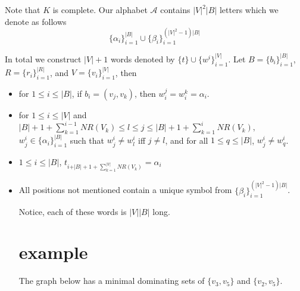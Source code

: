 \documentclass[10pt,a4paper]{article}
\begin{document}
Note that $K$ is complete. Our alphabet $\mathcal{A}$ contains 
$\vert V\vert^2\vert B\vert$ letters which we denote as follows
$$\{\alpha_{i}\}^{\vert B\vert}_{i=1}\cup \{\beta_{i}\}^{(\vert V\vert^2-1)\vert B\vert}_{i=1}$$

In total we construct $\vert V\vert+1$ words denoted by $\{ t\}\cup \{w^{i}\}^{\vert V\vert}_{i=1}$. Let $ B  = \{b_{i}\}^{\vert B\vert}
_{i=1}$, $ R  = \{r_{i}\}^{\vert R\vert}
_{i=1}$, and  $ V  = \{v_{i}\}^{\vert V\vert}_{i=1}$, then 
\begin{itemize}

\item for $1\leq i \leq \vert B\vert$, if $b_i = (v_j,v_k)$, then $w^j_i=w^k_i=\alpha_i$.

\item for $1\leq i \leq \vert V\vert$ and $\vert B\vert +1+\sum_{k=1}^{i-1} \mathit{NR}(V_{k})\leq l\leq j \leq \vert B\vert +1+\sum_{k=1}^{i} \mathit{NR}(V_{k}),$ $w^i_j \in \{\alpha_{i}\}^{\vert B\vert}_{i=1}$ such that $w^i_j \not = w^i_l$ iff $j\not = l$, and for all $1\leq q \leq \vert B\vert$, $w^i_j\not = w^i_q$. 
\item $1\leq i \leq \vert B\vert$, $t_{i+\vert B\vert +1+\sum_{k=1}^{\vert V\vert} \mathit{NR}(V_{k})} = \alpha_i$
\item All positions not mentioned contain a unique symbol from $\{\beta_{i}\}^{(\vert V\vert^2-1)\vert B\vert}_{i=1}$.

Notice, each of these words is $\vert V\vert \vert B\vert$ long. 
\section{example}

The graph below has a minimal dominating sets of $\{ v_3,v_5\}$ and $\{ v_2,v_5\}$.
\begin{center}
\end{center}


\end{itemize}
\end{document}
